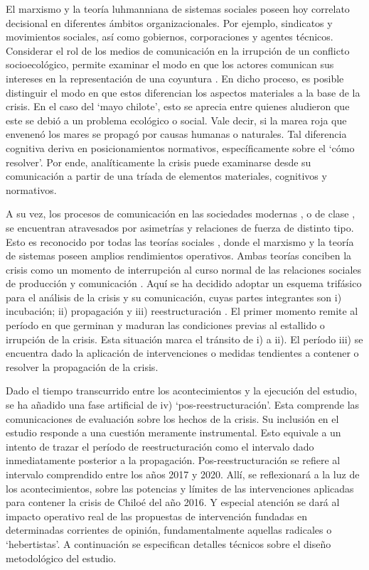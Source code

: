 \documentclass{textolivre}
\begin{document}
El marxismo y la teoría luhmanniana de sistemas sociales poseen hoy correlato
decisional en diferentes ámbitos organizacionales. Por ejemplo, sindicatos y movimientos
sociales, así como gobiernos, corporaciones y agentes técnicos. Considerar el rol de los
medios de comunicación en la irrupción de un conflicto socioecológico, permite examinar
el modo en que los actores comunican sus intereses en la representación de una
coyuntura \cite{Gunderson2019,Habermas2006}. En dicho
proceso, es posible distinguir el modo en que estos diferencian los aspectos materiales a
la base de la crisis. En el caso del ‘mayo chilote’, esto se aprecia entre quienes aludieron
que este se debió a un problema ecológico o social. Vale decir, si la marea roja que
envenenó los mares se propagó por causas humanas o naturales. Tal diferencia cognitiva
deriva en posicionamientos normativos, específicamente sobre el ‘cómo resolver’. Por
ende, analíticamente la crisis puede examinarse desde su comunicación a partir de una
tríada de elementos materiales, cognitivos y normativos.

A su vez, los procesos de comunicación en las sociedades modernas \cite{Tkke2010},
o de clase \cite{lenin1997,marx2003}, se encuentran atravesados por
asimetrías y relaciones de fuerza de distinto tipo. Esto es reconocido por todas las teorías
sociales \cite{Habermas2006,Luhmann2007,teubner2012}, donde el marxismo y
la teoría de sistemas poseen amplios rendimientos operativos. Ambas teorías conciben la
crisis como un momento de interrupción al curso normal de las relaciones sociales de
producción y comunicación \cite{Luhmann1984,marx2010}. Aquí se ha decidido adoptar
un esquema trifásico para el análisis de la crisis y su comunicación, cuyas partes
integrantes son i) incubación; ii) propagación y iii) reestructuración \cite{Mascareo2018b}. 
El primer momento remite al período en que germinan y maduran las condiciones
previas al estallido o irrupción de la crisis. Esta situación marca el tránsito de i) a ii). El
período iii) se encuentra dado la aplicación de intervenciones o medidas tendientes a
contener o resolver la propagación de la crisis.

Dado el tiempo transcurrido entre los acontecimientos y la ejecución del estudio, se
ha añadido una fase artificial de iv) ‘pos-reestructuración’. Esta comprende las
comunicaciones de evaluación sobre los hechos de la crisis. Su inclusión en el estudio
responde a una cuestión meramente instrumental. Esto equivale a un intento de trazar el
período de reestructuración como el intervalo dado inmediatamente posterior a la
propagación. Pos-reestructuración se refiere al intervalo comprendido entre los años 2017
y 2020. Allí, se reflexionará a la luz de los acontecimientos, sobre las potencias y límites
de las intervenciones aplicadas para contener la crisis de Chiloé del año 2016. Y especial
atención se dará al impacto operativo real de las propuestas de intervención fundadas en
determinadas corrientes de opinión, fundamentalmente aquellas radicales o ‘hebertistas’.
A continuación se especifican detalles técnicos sobre el diseño metodológico del estudio.
\end{document}
